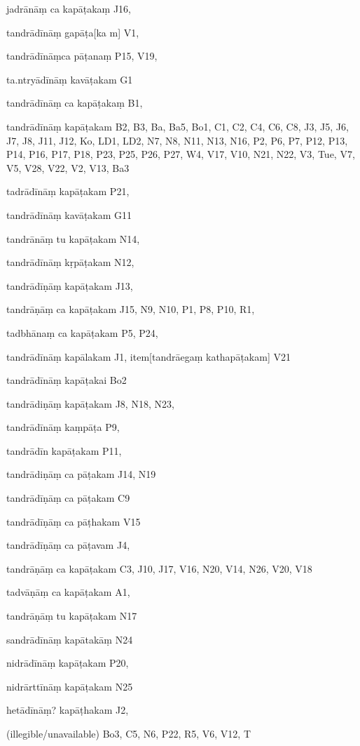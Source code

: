 \begin{ekdosis}
\begin{marma}[hp01_055]
\begin{marma}[hp02_009]
\begin{marma}[hp02_011]
 \begin{marma}[hp02_33b]
\item[jadrānāṃ ca kapāṭakaṃ] J16,
\item[tandrādīnāṃ gapāṭa[ka]m] V1,
\item[tandrādīnāṃca pāṭanaṃ] P15, V19,
\item[ta.ntryādīnāṃ kavāṭakam] G1
\item[tandrādīnāṃ ca kapāṭakaṃ] B1,
\item[tandrādīnāṃ kapāṭakam] B2, B3, Ba, Ba5, Bo1, C1, C2, C4, C6, C8, J3, J5, J6, J7, J8, J11, J12, Ko, LD1, LD2, N7, N8, N11, N13, N16, P2, P6, P7, P12, P13, P14, P16, P17, P18, P23, P25, P26, P27, W4, V17, V10, N21, N22, V3, Tue, V7, V5, V28, V22, V2, V13, Ba3
\item[tadrādīnāṃ kapāṭakam] P21,
\item[tandrādīnāṃ kavāṭakam] G11
\item[tandrānāṃ tu kapāṭakam] N14,
\item[tandrādīnāṃ kṛpāṭakam] N12, 
\item[tandrādīṇāṃ kapāṭakam] J13, 
\item[tandrāṇāṃ ca kapāṭakam] J15, N9, N10, P1, P8, P10, R1, 
\item[tadbhānaṃ ca kapāṭakam] P5, P24, 
\item[tandrādīnāṃ kapālakam] J1,
item[tandrāegaṃ kathapāṭakam] V21
\item[tandrādīnāṃ kapāṭakai] Bo2
\item[tandrādiṇāṃ kapāṭakam] J8, N18, N23,
\item[tandrādīnāṃ kaṃpāṭa] P9, 
\item[tandrādīn kapāṭakam] P11,
\item[tandrādiṇāṃ ca pāṭakam] J14, N19
\item[tandrādīṇāṃ ca pāṭakam] C9
\item[tandrādīṇāṃ ca pāṭhakam] V15
\item[tandrādīṇāṃ ca pāṭavam] J4,
\item[tandrāṇāṃ ca kapāṭakam] C3, J10, J17, V16, N20, V14, N26, V20, V18
\item[tadvāṇāṃ ca kapāṭakam] A1,
\item[tandrāṇāṃ tu kapāṭakam] N17
\item[sandrādīnāṃ kapātakāṃ] N24
\item[nidrādīnāṃ kapāṭakam] P20,
\item[nidrārttīnāṃ kapāṭakam] N25
\item[hetādīnāṃ? kapāṭhakam] J2,
\item[(illegible/unavailable)] Bo3, C5, N6, P22, R5, V6, V12, T
  \begin{description}


\end{description}
\end{marma}
\end{marma}
\end{marma}
\end{marma}
\end{ekdosis}
